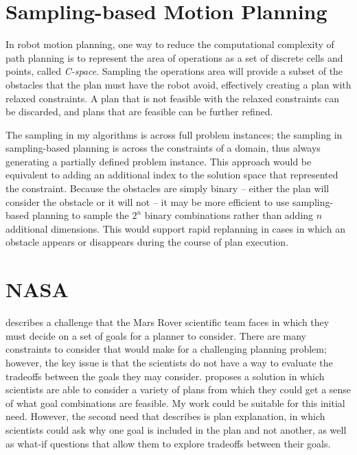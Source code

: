 \section{Sampling-based Motion Planning}

In robot motion planning, one way to reduce the computational complexity of path planning is to represent the area of operations as a set of discrete cells and points, called \textit{C-space}.  Sampling the operations area will provide a subset of the obstacles that the plan must have the robot avoid, effectively creating a plan with relaxed constraints.  A plan that is not feasible with the relaxed constraints can be discarded, and plans that are feasible can be further refined.  

The sampling in my algorithms is across full problem instances; the sampling in sampling-based planning is across the constraints of a domain, thus always generating a partially defined problem instance.  This approach would be equivalent to adding an additional index to the solution space that represented the constraint.  Because the obstacles are simply binary -- either the plan will consider the obstacle or it will not -- it may be more efficient to use sampling-based planning to sample the $2^n$ binary combinations rather than adding $n$ additional dimensions.  This would support rapid replanning in cases in which an obstacle appears or disappears during the course of plan execution.

\section{NASA}

\cite{DBLP:conf/aaai/Smith12} describes a challenge that the Mars Rover scientific team faces in which they must decide on a set of goals for a planner to consider.  There are many constraints to consider that would make for a challenging planning problem; however, the key issue is that the scientists do not have a way to evaluate the tradeoffs between the goals they may consider.  \citeauthor{DBLP:conf/aaai/Smith12} proposes a solution in which scientists are able to consider a variety of plans from which they could get a sense of what goal combinations are feasible.  My work could be suitable for this initial need.  However, the second need that \citeauthor{DBLP:conf/aaai/Smith12} describes is plan explanation, in which scientists could ask why one goal is included in the plan and not another, as well as what-if questions that allow them to explore tradeoffs between their goals.  

